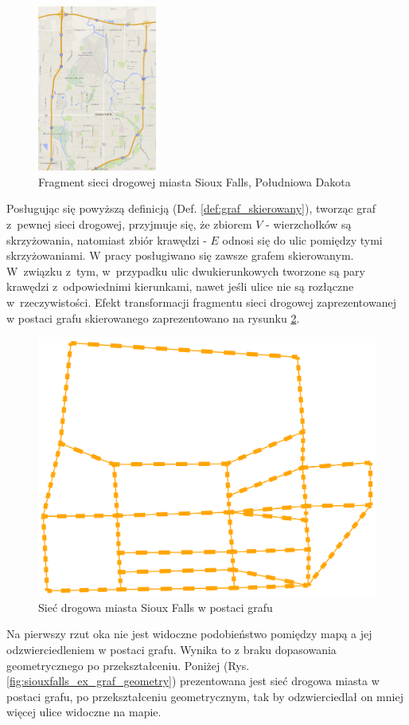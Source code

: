 \documentclass[twoside,12pt]{report}
\begin{document}
\begin{figure}[htbp]
	\centering
	\includegraphics[width=0.35\textwidth]{img/siec}
	\caption{Fragment sieci drogowej miasta Sioux Falls, Południowa Dakota} 
	\label{fig:fragment_sieci_siouxfalls}
\end{figure}

Posługując się powyższą definicją (Def. \ref{def:graf_skierowany}), tworząc graf z~pewnej sieci drogowej, przyjmuje się, że zbiorem $V$ - wierzchołków są skrzyżowania, natomiast zbiór krawędzi - $E$ odnosi się do ulic pomiędzy tymi skrzyżowaniami. W pracy posługiwano się zawsze grafem skierowanym. W~związku z~tym, w~przypadku ulic dwukierunkowych tworzone są pary krawędzi z~odpowiednimi kierunkami, nawet jeśli ulice nie są rozłączne w~rzeczywistości. Efekt transformacji fragmentu sieci drogowej zaprezentowanej w postaci grafu skierowanego zaprezentowano na rysunku \ref{fig:siouxfalls_ex_graf}.

\begin{figure}[htbp]
	\centering
	\includegraphics[width=0.45\linewidth]{img/graf}
	\caption{Sieć drogowa miasta Sioux Falls w postaci grafu}
	\label{fig:siouxfalls_ex_graf}
\end{figure}

Na pierwszy rzut oka nie jest widoczne podobieństwo pomiędzy mapą a jej odzwierciedleniem w postaci grafu. Wynika to z braku dopasowania geometrycznego po przekształceniu. Poniżej (Rys. \ref{fig:siouxfalls_ex_graf_geometry}) prezentowana jest sieć drogowa miasta w postaci grafu, po przekształceniu geometrycznym, tak by odzwierciedlał on mniej więcej ulice widoczne na mapie.
\end{document}
